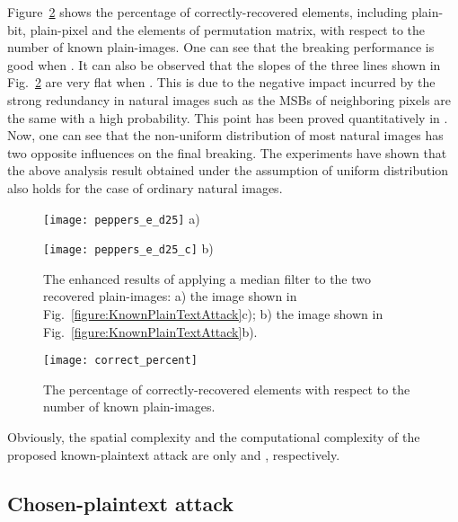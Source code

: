 \documentclass[3p,preprint,11pt]{elsarticle}
\newlength\imagewidth
\newlength\figwidth
\begin{document}
Figure~\ref{figure:CorrectPercentage} shows the percentage of
correctly-recovered elements, including plain-bit, plain-pixel and
the elements of permutation matrix, with respect to the number of
known plain-images. One can see that the breaking performance is
good when . It can also be observed that the slopes of the
three lines shown in Fig.~\ref{figure:CorrectPercentage} are very
flat when . This is due to the negative impact incurred
by the strong redundancy in natural images such as the MSBs of
neighboring pixels are the same with a high probability. This point
has been proved quantitatively in \cite{Li:AttackingPOMC2008}. Now,
one can see that the non-uniform distribution of most natural images
has two opposite influences on the final breaking. The experiments
have shown that the above analysis result obtained under the assumption
of uniform distribution also holds for the case of ordinary natural
images.

\begin{figure}[!htb]
\centering
\begin{minipage}[t]{\figwidth}
\centering
\texttt{[image: peppers\_e\_d25]}
a)
\end{minipage}
\begin{minipage}[t]{\figwidth}
\centering
\texttt{[image: peppers\_e\_d25\_c]}
b)
\end{minipage}
\caption{The enhanced results of applying a  median filter to the two recovered plain-images: a) the image shown in
Fig.~\ref{figure:KnownPlainTextAttack}c); b) the image shown in
Fig.~\ref{figure:KnownPlainTextAttack}b).} \label{figure:enhanced}
\end{figure}

\begin{figure}
\centering
\begin{minipage}[t]{1.5\imagewidth}
\centering
\texttt{[image: correct\_percent]}
\end{minipage}
\caption{The percentage of correctly-recovered elements with respect
to the number of known plain-images.}
\label{figure:CorrectPercentage}
\end{figure}

Obviously, the spatial complexity and the computational
complexity of the proposed known-plaintext attack are only  and
, respectively.

\subsection{Chosen-plaintext attack}
\end{document}
